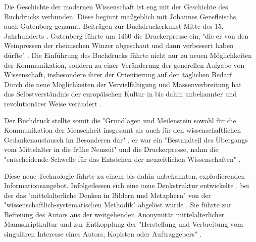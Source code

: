 Die Geschichte der modernen Wissenschaft ist eng mit der Geschichte des Buchdrucks verbunden. Diese beginnt maßgeblich mit Johannes Gensfleischs, auch Gutenberg genannt, Beiträgen zur Buchdruckerkunst \cite{wittmann_1999_geschichte} Mitte des 15. Jahrhunderts \cite{suchen}. Gutenberg führte um 1460 die Druckerpresse ein, "die er von den Weinpressen der rheinischen Winzer abgeschaut und dann verbessert haben dürfte" \cite{stober_2014_pressegeschichte}. Die Einführung des Buchdrucks führte nicht nur zu neuen Möglichkeiten der Kommunikation, sondern zu einer Veränderung der generellen Aufgabe von Wissenschaft, insbesondere ihrer der Orientierung auf den täglichen Bedarf \cite{Luhmann1998}. Durch die neue Möglichkeiten der Vervielfältigung und Massenverbreitung hat das Selbstverständnis der europäischen Kultur in bis dahin unbekannter \cite{giesecke_1991_buchdruck} und revolutionärer Weise verändert \cite{wunderlich_2008_buchdruck} \cite{stober_2014_pressegeschichte}.

Der Buchdruck stellte somit die "Grundlagen und Meilenstein sowohl für die Kommunikation der Menschheit insgesamt als auch für den wissenschaftlichen Gedankenaustausch im Besonderen dar" \cite{schirmbacher_2009_wisspub}, er war ein "Bestandteil des Übergangs vom Mittelalter in die frühe Neuzeit" \cite{lange2008medienwettbewerb} und die Druckerpresse, nahm die "entscheidende Schwelle für das Entstehen der neuzeitlichen Wissenschaften" \cite{luhmann_1997_gesellschaft}.

Diese neue Technologie führte zu einem bis dahin unbekannten, explodierenden Informationsangebot. Infolgedessen sich eine neue Denkstruktur entwickelte \cite{eisenstein_1997_druckerpresse}, bei der das "mittelalterliche Denken in Bildern und Metaphern" von der "wissenschaftlich-systematischen Methodik" abgelöst wurde \cite{wunderlich_2008_buchdruck}. Sie führte zur Befreiung des Autors aus der weitgehenden Anonymität mittelalterlicher Manuskriptkultur und zur Entkopplung der "Herstellung und Verbreitung vom singulären Interesse eines Autors, Kopisten oder Auftraggebers"\cite{wunderlich_2008_buchdruck} \cite{schirmbacher_2009_wisspub}.

